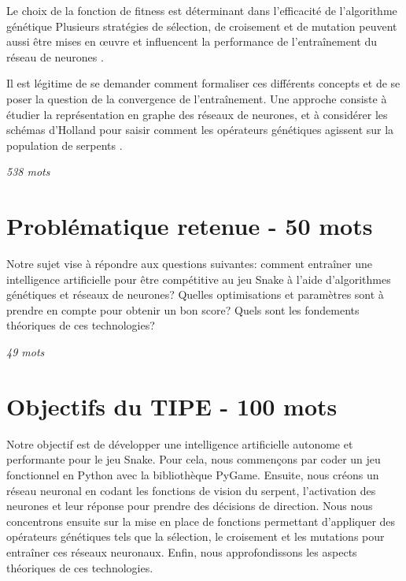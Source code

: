 \documentclass[11pt,a4paper]{article}
\begin{document}
Le choix de la fonction de fitness est déterminant dans l’efficacité de l’algorithme génétique 
Plusieurs stratégies de sélection, de croisement et de mutation peuvent aussi être mises en œuvre et influencent la performance de l’entraînement du réseau de neurones \cite{snakeGameAiYeh2016}.

Il est légitime de se demander comment formaliser ces différents concepts et de se poser la question de la convergence de l’entraînement.
Une approche consiste à étudier la représentation en graphe des réseaux de neurones, et à considérer les schémas d'Holland pour saisir comment les opérateurs génétiques agissent sur la population de serpents \cite{davis1991handbookGeneticAlgorithms,whitley1994geneticAlgorithmTutorial}.



\textit{538 mots}

\section{Problématique retenue - 50 mots}

Notre sujet vise à répondre aux questions suivantes:
comment entraîner une intelligence artificielle pour être compétitive au jeu Snake à l'aide d'algorithmes génétiques et réseaux de neurones?
Quelles optimisations et paramètres sont à prendre en compte pour obtenir un bon score?
Quels sont les fondements théoriques de ces technologies?

\textit{49 mots}

\section{Objectifs du TIPE - 100 mots}

Notre objectif est de développer une intelligence artificielle autonome et performante pour le jeu Snake.
Pour cela, nous commençons par coder un jeu fonctionnel en Python avec la bibliothèque PyGame. 
Ensuite, nous créons un réseau neuronal en codant les fonctions de vision du serpent, l'activation des neurones et leur réponse pour prendre des décisions de direction.
Nous nous concentrons ensuite sur la mise en place de fonctions permettant d'appliquer des opérateurs génétiques tels que la sélection, le croisement et les mutations pour entraîner ces réseaux neuronaux.
Enfin, nous approfondissons les aspects théoriques de ces technologies.
\end{document}
